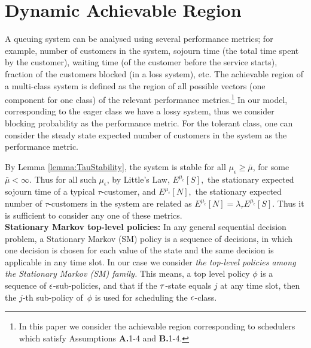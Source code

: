 \section{Dynamic Achievable Region}
\label{sec:Achievable Region}

A queuing system can be analysed using several performance metrics;
for example, number of customers in the system, sojourn time (the
total time spent by the customer), waiting time (of the customer
before the service starts), fraction of the customers blocked (in a
loss system), etc. The achievable region of a multi-class system is
defined as the region of all possible vectors (one component for one
class) of the relevant performance metrics.\footnote{In this paper we consider the achievable region corresponding to schedulers which satisfy Assumptions {\bf A.}1-4 and {\bf B.}1-4.}  In our model,
corresponding to the eager class we have a lossy system, thus we
consider blocking probability as the performance metric. For the
tolerant class, one can consider the steady state expected number of
customers in the system as the performance metric.

By Lemma \ref{lemma:TauStability}, the system is stable for all
$\mu_\epsilon \geq \bar{\mu}$, for some $\bar{\mu} < \infty$.  Thus
for all such $\mu_\epsilon$, by Little's Law, $E^{\mu_\epsilon} [S],$
the stationary expected sojourn time of a typical $\tau$-customer, and
$E^{\mu_\epsilon} [N],$ the stationary expected number of
$\tau$-customers in the system are related as $ E^{\mu_\epsilon} [ N ]
= \lambda_\tau E^{\mu_\epsilon} [S ].$ Thus it is sufficient to
consider any one of these metrics.\\

{\bf Stationary Markov top-level policies:} In any general sequential
decision problem, a Stationary Markov (SM) policy is a sequence of
decisions, in which one decision is chosen for each value of the state
and the same decision is applicable in any time slot.  In our case we
consider {\it the top-level policies among the Stationary Markov (SM)
  family.}  This means, a top level policy $\phi$ is a sequence of
${ \epsilon }$-sub-policies, and that if the ${\tau}$-state equals $j$ at any time
slot, then the $j$-th sub-policy of~$\phi$ is used for scheduling the
${ \epsilon }$-class.



